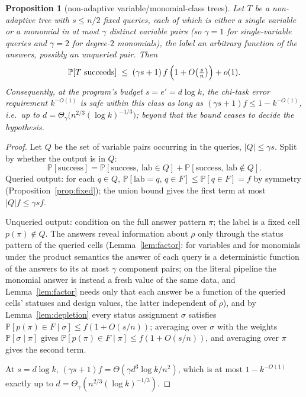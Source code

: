 \documentclass[11pt]{article}
\newtheorem{proposition}[theorem]{Proposition}
\theoremstyle{definition}
\theoremstyle{remark}
\newcommand{\Prob}{\mathbb{P}}
\newcommand{\lab}{\mathrm{lab}}
\begin{document}
\begin{proposition}[non-adaptive variable/monomial-class trees]
\label{prop:nonadaptall}
Let $T$ be a non-adaptive tree with $s\le n/2$ fixed queries, each of
which is either a single variable or a monomial in at most $\gamma$
distinct variable pairs (so $\gamma=1$ for single-variable queries and
$\gamma=2$ for degree-$2$ monomials), the label an arbitrary function
of the answers, possibly an unqueried pair.  Then
\[
\Prob[T\text{ succeeds}]
\;\le\;(\gamma s+1)\,f\,\Bigl(1+O\bigl(\tfrac{s}{n}\bigr)\Bigr)+o(1).
\]
Consequently, at the program's budget $s=e'=d\log k$, the chi-task error
requirement $k^{-O(1)}$ is safe within this class as long as
$(\gamma s+1)f\le 1-k^{-O(1)}$, i.e.\ up to
$d=\Theta_\gamma\bigl(n^{2/3}(\log k)^{-1/3}\bigr)$; beyond that the
bound ceases to decide the hypothesis.
\end{proposition}

\begin{proof}
Let $Q$ be the set of variable pairs occurring in the queries,
$|Q|\le\gamma s$.  Split by whether the output is in $Q$:
\[
\Prob[\text{success}]
=\Prob[\text{success},\,\lab\in Q]
 +\Prob[\text{success},\,\lab\notin Q].
\]
Queried output: for each $q\in Q$,
$\Prob[\lab=q,\,q\in F]\le\Prob[q\in F]=f$ by symmetry
(Proposition~\ref{prop:fixed}); the union bound gives the first term at
most $|Q|f\le\gamma s f$.

Unqueried output: condition on the full answer pattern $\pi$; the label
is a fixed cell $p(\pi)\notin Q$.  The answers reveal information about
$\rho$ only through the status pattern of the queried cells
(Lemma~\ref{lem:factor}: for variables and for monomials under the
product semantics the answer of each query is a deterministic function
of the answers to its at most $\gamma$ component pairs; on the literal
pipeline the monomial answer is instead a fresh value of the same data,
and Lemma~\ref{lem:factor} needs only that each answer be a function of
the queried cells' statuses and design values, the latter independent
of $\rho$), and by
Lemma~\ref{lem:depletion} every status assignment $\sigma$ satisfies
$\Prob[p(\pi)\in F\mid\sigma]\le f(1+O(s/n))$; averaging over
$\sigma$ with the weights $\Prob[\sigma\mid\pi]$ gives
$\Prob[p(\pi)\in F\mid\pi]\le f(1+O(s/n))$, and averaging over $\pi$
gives the second term.

At $s=d\log k$, $(\gamma s+1)f=\Theta(\gamma d^3\log k/n^2)$, which is
at most $1-k^{-O(1)}$ exactly up to
$d=\Theta_\gamma(n^{2/3}(\log k)^{-1/3})$.
\end{proof}
\end{document}
